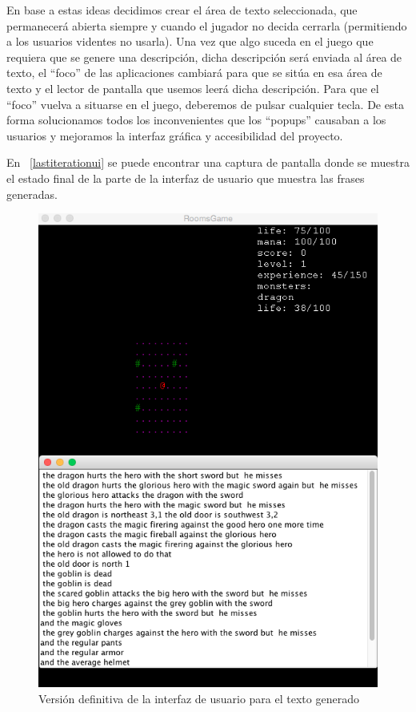 En base a estas ideas decidimos crear el área de texto seleccionada, que permanecerá abierta siempre y cuando el jugador no decida cerrarla (permitiendo a los usuarios videntes no usarla). Una vez que algo suceda en el juego que requiera que se genere una descripción, dicha descripción será enviada al área de texto, el ``foco'' de las aplicaciones cambiará para que se sitúa en esa área de texto y el lector de pantalla que usemos leerá dicha descripción. Para que el ``foco'' vuelva a situarse en el juego, deberemos de pulsar cualquier tecla.
De esta forma solucionamos todos los inconvenientes que los ``popups'' causaban a los usuarios y mejoramos la interfaz gráfica y accesibilidad del proyecto.

En ~\ref{lastiterationui} se puede encontrar una captura de pantalla donde se muestra el estado final de la parte de la interfaz de usuario que muestra las frases generadas.

\begin{figure}
    \includegraphics[width=\textwidth,height=\textheight,keepaspectratio]{./img/lastiterationui.png}
  \caption{Versión definitiva de la interfaz de usuario para el texto generado}
  \label{fig:lastiterationui}
\end{figure}

